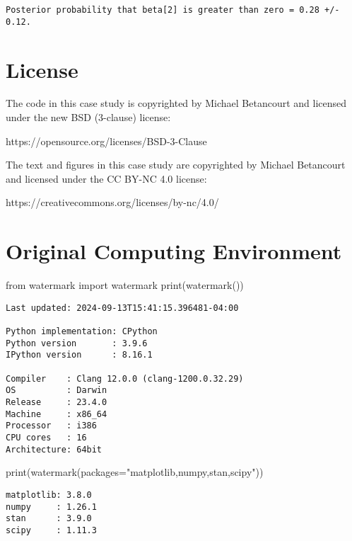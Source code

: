 \documentclass[
  letterpaper,
  DIV=11,
  numbers=noendperiod]{scrartcl}
\newenvironment{Shaded}{\begin{snugshade}}{\end{snugshade}}
\newcommand{\BuiltInTok}[1]{\textcolor[rgb]{0.00,0.23,0.31}{#1}}
\newcommand{\ImportTok}[1]{\textcolor[rgb]{0.00,0.46,0.62}{#1}}
\newcommand{\NormalTok}[1]{\textcolor[rgb]{0.00,0.23,0.31}{#1}}
\newcommand{\OperatorTok}[1]{\textcolor[rgb]{0.37,0.37,0.37}{#1}}
\newcommand{\StringTok}[1]{\textcolor[rgb]{0.13,0.47,0.30}{#1}}
\begin{document}
\begin{verbatim}
Posterior probability that beta[2] is greater than zero = 0.28 +/- 0.12.
\end{verbatim}

\section*{License}\label{license}

The code in this case study is copyrighted by Michael Betancourt and
licensed under the new BSD (3-clause) license:

https://opensource.org/licenses/BSD-3-Clause

The text and figures in this case study are copyrighted by Michael
Betancourt and licensed under the CC BY-NC 4.0 license:

https://creativecommons.org/licenses/by-nc/4.0/

\section*{Original Computing
Environment}\label{original-computing-environment}

\begin{Shaded}
\begin{Highlighting}[]
\ImportTok{from}\NormalTok{ watermark }\ImportTok{import}\NormalTok{ watermark}
\BuiltInTok{print}\NormalTok{(watermark())}
\end{Highlighting}
\end{Shaded}

\begin{verbatim}
Last updated: 2024-09-13T15:41:15.396481-04:00

Python implementation: CPython
Python version       : 3.9.6
IPython version      : 8.16.1

Compiler    : Clang 12.0.0 (clang-1200.0.32.29)
OS          : Darwin
Release     : 23.4.0
Machine     : x86_64
Processor   : i386
CPU cores   : 16
Architecture: 64bit
\end{verbatim}

\begin{Shaded}
\begin{Highlighting}[]
\BuiltInTok{print}\NormalTok{(watermark(packages}\OperatorTok{=}\StringTok{"matplotlib,numpy,stan,scipy"}\NormalTok{))}
\end{Highlighting}
\end{Shaded}

\begin{verbatim}
matplotlib: 3.8.0
numpy     : 1.26.1
stan      : 3.9.0
scipy     : 1.11.3
\end{verbatim}
\end{document}
